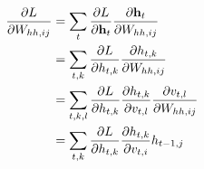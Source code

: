 \begin{equation}
\begin{split}
    \frac{\partial L}{\partial W_{hh,ij}}
        &= \sum_t \frac{\partial L}{\partial {\mathbf{h}}_t} \frac{\partial {\mathbf{h}}_t}{\partial W_{hh,ij}} \\
        &= \sum_{t,k} \frac{\partial L}{\partial h_{t,k}} \frac{\partial h_{t,k}}{\partial W_{hh,ij}} \\
        &= \sum_{t,k,l} \frac{\partial L}{\partial h_{t,k}} \frac{\partial h_{t,k}}{\partial v_{t,l}}\frac{\partial v_{t,l}}{\partial W_{hh,ij}} \\
        &= \sum_{t,k} \frac{\partial L}{\partial h_{t,k}} \frac{\partial h_{t,k}}{\partial v_{t,i}}h_{t-1,j} \\
\end{split}
\end{equation}
